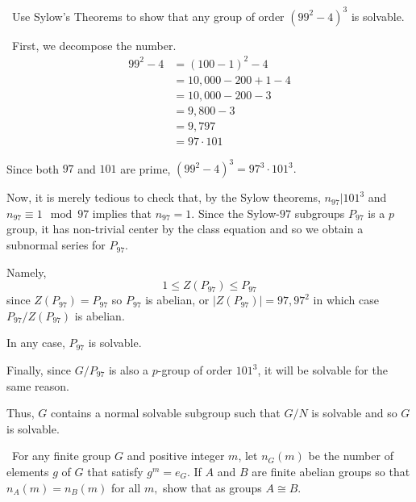 \documentclass[12pt]{AlgebraQual}
\begin{document}
\begin{problem} $\,$
Use Sylow's Theorems to show that any group of order $(99^2-4)^3$ is solvable.
\end{problem}


\begin{solution}$\,$
First, we decompose the number. \begin{align*}
    99^2-4&=(100-1)^2-4\\
    &=10,000-200+1-4\\
    &=10,000-200-3\\
    &=9,800-3\\
    &=9,797\\
    &=97\cdot 101
\end{align*}

Since both $97$ and $101$ are prime, $(99^2-4)^3=97^3\cdot 101^3.$

Now, it is merely tedious to check that, by the Sylow theorems, $n_{97}|101^3$ and $n_{97}\equiv 1\mod 97$ implies that $n_{97}=1.$
Since the Sylow-$97$ subgroups $P_{97}$ is a $p$ group, it has non-trivial center by the class equation and so we obtain a subnormal series for $P_{97}.$

Namely, $$1\le Z(P_{97})\le P_{97}$$ since $Z(P_{97})=P_{97}$ so $P_{97}$ is abelian, or $|Z(P_{97})|=97,97^2$ in which case $P_{97}/Z(P_{97})$ is abelian.

In any case, $P_{97}$ is solvable.

Finally, since $G/P_{97}$ is also a $p$-group of order $101^3$, it will be solvable for the same reason.

Thus, $G$ contains a normal solvable subgroup such that $G/N$ is solvable and so $G$ is solvable.
\end{solution}
\newpage

\begin{problem} $\,$
For any finite group $G$ and positive integer $m$, let $n_G(m)$ be the number of elements $g$ of $G$ that satisfy $g^m=e_G$. If $A$ and $B$ are finite abelian groups so that $n_A(m)=n_B(m)$ for all $m,$ show that as groups $A\cong B$.
\end{problem}
\end{document}
